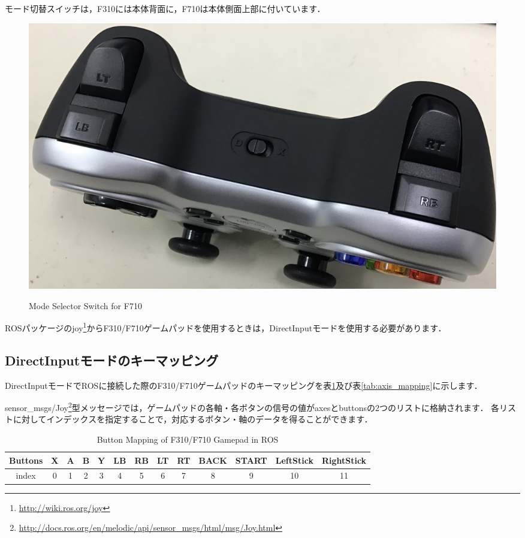 \documentclass[{../../master}]{subfiles}
\begin{document}
  \noindent
  モード切替スイッチは，F310には本体背面に，F710は本体側面上部に付いています．

  \begin{figure}[ht]
    \centering
    \includegraphics[clip, width=65truemm]{images/mode_switch.jpg}
    \label{fig:mode_switch}
    \caption{Mode Selector Switch for F710}
  \end{figure}

  ROSパッケージの\textsf{joy}\footnote{\url{http://wiki.ros.org/joy}}からF310/F710ゲームパッドを使用するときは，\textsf{DirectInput}モードを使用する必要があります．

\subsection{\textsf{DirectInput}モードのキーマッピング}

\textsf{DirectInput}モードでROSに接続した際のF310/F710ゲームパッドのキーマッピングを表\ref{tab:buttom_mapping}及び表\ref{tab:axis_mapping}に示します．

\textsf{sensor\_msgs/Joy}\footnote{\url{http://docs.ros.org/en/melodic/api/sensor_msgs/html/msg/Joy.html}}型メッセージでは，ゲームパッドの各軸・各ボタンの信号の値が\textsf{axes}と\textsf{buttons}の2つのリストに格納されます．
各リストに対してインデックスを指定することで，対応するボタン・軸のデータを得ることができます．

\begin{table}[h]
  \begin{center}
    \caption{Button Mapping of F310/F710 Gamepad in ROS}
    \begin{tabular}{|c|c|c|c|c|c|c|c|c|c|c|c|c|} \hline
      Buttons & X & A & B & Y & LB & RB & LT & RT & BACK & START & LeftStick & RightStick \\ \hline
       index  & 0 & 1 & 2 & 3 & 4  & 5  & 6  & 7  & 8    &   9   &   10      &     11     \\ \hline
    \end{tabular}
    \label{tab:buttom_mapping}
  \end{center}
\end{table}
\end{document}

